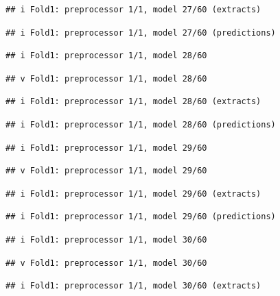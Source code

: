 \documentclass[
]{article}
\begin{document}
\begin{verbatim}
## i Fold1: preprocessor 1/1, model 27/60 (extracts)
\end{verbatim}

\begin{verbatim}
## i Fold1: preprocessor 1/1, model 27/60 (predictions)
\end{verbatim}

\begin{verbatim}
## i Fold1: preprocessor 1/1, model 28/60
\end{verbatim}

\begin{verbatim}
## v Fold1: preprocessor 1/1, model 28/60
\end{verbatim}

\begin{verbatim}
## i Fold1: preprocessor 1/1, model 28/60 (extracts)
\end{verbatim}

\begin{verbatim}
## i Fold1: preprocessor 1/1, model 28/60 (predictions)
\end{verbatim}

\begin{verbatim}
## i Fold1: preprocessor 1/1, model 29/60
\end{verbatim}

\begin{verbatim}
## v Fold1: preprocessor 1/1, model 29/60
\end{verbatim}

\begin{verbatim}
## i Fold1: preprocessor 1/1, model 29/60 (extracts)
\end{verbatim}

\begin{verbatim}
## i Fold1: preprocessor 1/1, model 29/60 (predictions)
\end{verbatim}

\begin{verbatim}
## i Fold1: preprocessor 1/1, model 30/60
\end{verbatim}

\begin{verbatim}
## v Fold1: preprocessor 1/1, model 30/60
\end{verbatim}

\begin{verbatim}
## i Fold1: preprocessor 1/1, model 30/60 (extracts)
\end{verbatim}
\end{document}
